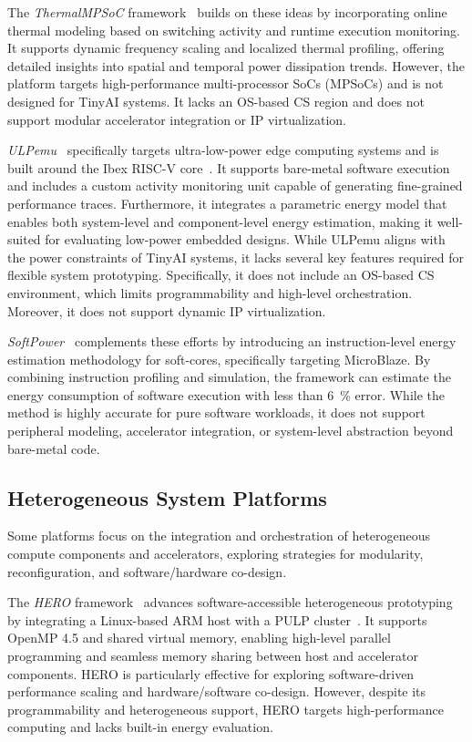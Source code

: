             The \emph{ThermalMPSoC} framework~\cite{thermalmpsoc} builds on these ideas by incorporating online thermal modeling based on switching activity and runtime execution monitoring. It supports dynamic frequency scaling and localized thermal profiling, offering detailed insights into spatial and temporal power dissipation trends. However, the platform targets high-performance multi-processor SoCs (MPSoCs) and is not designed for TinyAI systems. It lacks an OS-based CS region and does not support modular accelerator integration or IP virtualization.
            
            \emph{ULPemu}~\cite{ulpemu} specifically targets ultra-low-power edge computing systems and is built around the Ibex RISC-V core~\cite{zeroriscy}. It supports bare-metal software execution and includes a custom activity monitoring unit capable of generating fine-grained performance traces. Furthermore, it integrates a parametric energy model that enables both system-level and component-level energy estimation, making it well-suited for evaluating low-power embedded designs. While ULPemu aligns with the power constraints of TinyAI systems, it lacks several key features required for flexible system prototyping. Specifically, it does not include an OS-based CS environment, which limits programmability and high-level orchestration. Moreover, it does not support dynamic IP virtualization.
            
            \emph{SoftPower}~\cite{softpower} complements these efforts by introducing an instruction-level energy estimation methodology for soft-cores, specifically targeting MicroBlaze. By combining instruction profiling and simulation, the framework can estimate the energy consumption of software execution with less than \SI{6}{\percent} error. While the method is highly accurate for pure software workloads, it does not support peripheral modeling, accelerator integration, or system-level abstraction beyond bare-metal code.
        
        \subsection{Heterogeneous System Platforms}
        
            Some platforms focus on the integration and orchestration of heterogeneous compute components and accelerators, exploring strategies for modularity, reconfiguration, and software/hardware co-design.
            
            The \emph{HERO} framework~\cite{hero} advances software-accessible heterogeneous prototyping by integrating a Linux-based ARM host with a PULP cluster~\cite{pulp_cluster}. It supports OpenMP 4.5 and shared virtual memory, enabling high-level parallel programming and seamless memory sharing between host and accelerator components. HERO is particularly effective for exploring software-driven performance scaling and hardware/software co-design. However, despite its programmability and heterogeneous support, HERO targets high-performance computing and lacks built-in energy evaluation.
            
